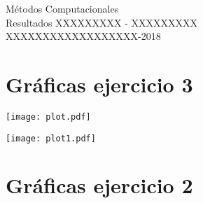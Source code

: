 \documentclass[11pt,letterpaper]{exam}
\begin{document}
\begin{center}
{\Large Métodos Computacionales} \\
Resultados XXXXXXXXX - \textsc{XXXXXXXXX}\\
XXXXXXXXXXXXXXXXXX-2018\\
\end{center}


\noindent
\section{Gr\'aficas ejercicio 3}
\begin{center}
\texttt{[image: plot.pdf]} 
\begin{center}
\end{center}
\texttt{[image: plot1.pdf]} 
\end{center}

\section{Gr\'aficas ejercicio 2}
\end{document}
